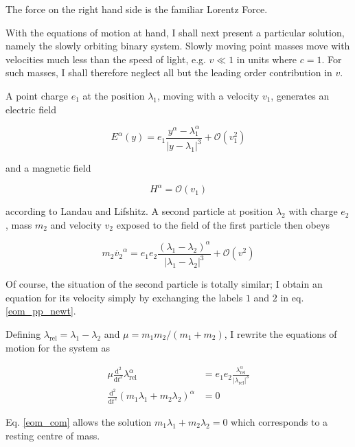 \documentclass[11pt]{article}
\begin{document}
The force on the right hand side is the familiar Lorentz Force.

With the equations of motion at hand, I shall next present a particular solution, namely the slowly orbiting binary system. Slowly moving point masses move with velocities much less than the speed of light, e.g.  $ v \ll 1 $ in units where $c = 1$. For such masses, I shall therefore neglect all but the leading order contribution in $v$.

A point charge $e_1$ at the position $\lambda_1$, moving with a velocity $v_1$, generates an electric field 

\begin{equation}
	E^\alpha(y) = e_1 \frac{y^\alpha - \lambda_1^\alpha }{\left| y - \lambda_1\right|^3} 
	+ \mathcal{O}\left(v_1^2 \right)
\end{equation}

and a magnetic field

\begin{equation}
	H^\alpha = \mathcal{O}\left(v_1 \right)
\end{equation}

according to Landau and Lifshitz. A second particle at position $\lambda_2$ with charge $e_2$, mass $m_2$ and velocity $v_2$ exposed to the field of the first particle then obeys 

\begin{equation} \label{eom_pp_newt}
	m_2 \dot{v_2}^\alpha = e_1 e_2 \frac{\left( \lambda_1 - \lambda_2\right)^\alpha}{\left| \lambda_1 - \lambda_2\right|^3} + \mathcal{O}\left(v^2\right)
\end{equation}

Of course, the situation of the second particle is totally similar; I obtain an equation for its velocity simply by exchanging the labels $1$ and $2$ in eq. \ref{eom_pp_newt}. 

Defining $\lambda_{\text{rel}} = \lambda_1 - \lambda_2$ and $\mu = m_1 m_2 / \left( m_1 + m_2 \right)$, I rewrite the equations of motion for the system as

\begin{align}
	\mu \frac{\mathrm{d}^2}{\mathrm{d}t^2} \lambda_{\text{rel}}^\alpha 
	&= e_1 e_2 \frac{\lambda_{\text{rel}}^\alpha}{\left| \lambda_{\text{rel}} \right|^3} \label{eom_rel}\\
	\frac{\mathrm{d}^2}{\mathrm{d}t^2} \left( m_1 \lambda_1 + m_2 \lambda_2 \right)^\alpha 
	&= 0 \label{eom_com}
\end{align}

Eq. \ref{eom_com} allows the solution $m_1 \lambda_1 + m_2 \lambda_2 = 0$ which corresponds to a resting centre of mass.
\end{document}
